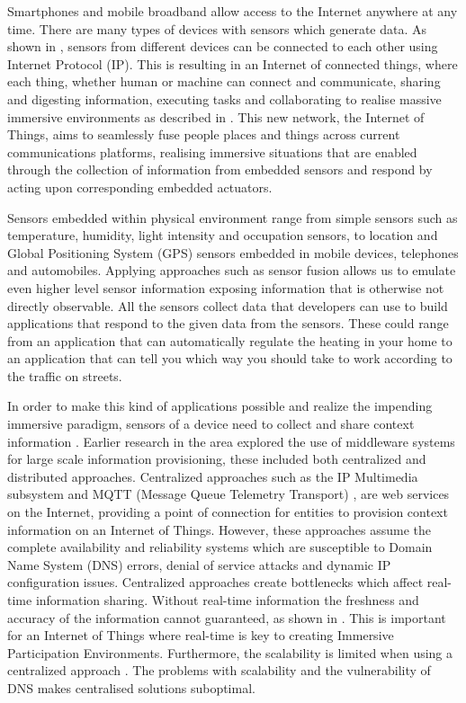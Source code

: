 Smartphones and mobile broadband allow access to the Internet anywhere at any time. There are many types of devices with sensors which generate data. As shown in \cite{chui2010internet}, sensors from different devices can be connected to each other using Internet Protocol (IP). This is resulting in an Internet of connected things, where each thing, whether human or machine can connect and communicate, sharing and digesting information, executing tasks and collaborating to realise massive immersive environments as described in \cite{tan2010future}. This new network, the Internet of Things, aims to seamlessly fuse people places and things across current communications platforms, realising immersive situations that are enabled through the collection of information from embedded sensors and respond by acting upon corresponding embedded actuators. 

Sensors embedded within physical environment range from simple sensors such as temperature, humidity, light intensity and occupation sensors, to location and Global Positioning System (GPS) sensors embedded in mobile devices, telephones and automobiles. Applying approaches such as sensor fusion allows us to emulate even higher level sensor information exposing information that is otherwise not directly observable. All the sensors collect data that developers can use to build applications that respond to the given data from the sensors. These could range from an application that can automatically regulate the heating in your home to an application that can tell you which way you should take to work according to the traffic on streets.

In order to make this kind of applications possible and realize the impending immersive paradigm, sensors of a device need to collect and share context information \cite{dey2001understanding}. Earlier research in the area explored the use of middleware systems for large scale information provisioning, these included both centralized and distributed approaches. Centralized approaches such as the IP Multimedia subsystem \cite{Kardeby:2010:UMF:1845879.1846331} and MQTT (Message Queue Telemetry Transport) \cite{HunkelerTS08}, are web services on the Internet, providing a point of connection for entities to provision context information on an Internet of Things. However, these approaches assume the complete availability and reliability systems which are susceptible to Domain Name System (DNS) errors, denial of service attacks and dynamic IP configuration issues. Centralized approaches create bottlenecks which affect real-time information sharing. Without real-time information the freshness and accuracy of the information cannot guaranteed, as shown in \cite{Walters437970}. This is important for an Internet of Things where real-time is key to creating Immersive Participation Environments. Furthermore, the scalability is limited when using a centralized approach \cite{Kanter539187}. The problems with scalability and the vulnerability of DNS makes centralised solutions suboptimal. 

